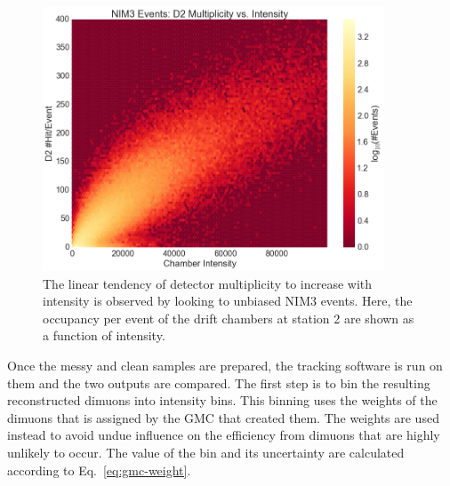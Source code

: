 \begin{figure}
	\centering
	\includegraphics[width=4in]{figures/analysis/NIM3-Int-Mult.png}
	\caption{The linear tendency of detector multiplicity to increase with intensity is observed by looking to unbiased NIM3 events. Here, the occupancy per event of the drift chambers at station 2 are shown as a function of intensity.}
	\label{fig:NIM3-Int-Mult}
\end{figure}

Once the messy and clean samples are prepared, the tracking software is run on them and the two outputs are compared. The first step is to bin the resulting reconstructed dimuons into intensity bins. This binning uses the weights of the dimuons that is assigned by the GMC that created them. The weights are used instead to avoid undue influence on the efficiency from dimuons that are highly unlikely to occur. The value of the bin and its uncertainty are calculated according to Eq.~\ref{eq:gmc-weight}.

